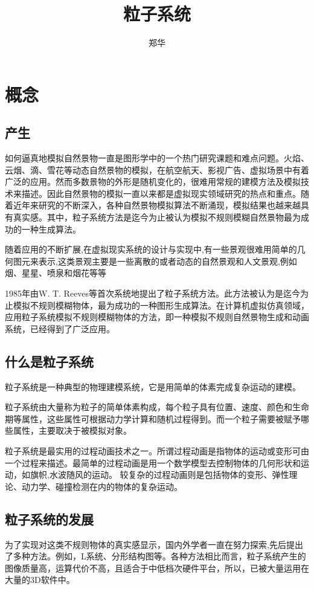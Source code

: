 \documentclass[UTF8,a4paper,14pt]{ctexart}
\author{\kaishu 郑华}
\title{\heiti 粒子系统}
\begin{document}
 	\maketitle

\newpage
\section{概念}
	\subsection{产生}
		如何逼真地模拟自然景物一直是图形学中的一个热门研究课题和难点问题。火焰、云烟、滴、雪花等动态自然景物的模拟，在航空航天、影视广告、虚拟场景中有着广泛的应用。然而多数景物的外形是随机变化的，很难用常规的建模方法及模拟技术来描述。因此自然景物的模拟一直以来都是虚拟现实领域研究的热点和重点。随着近年来研究的不断深入，各种自然景物模拟算法不断涌现，模拟结果也越来越具有真实感。其中，粒子系统方法是迄今为止被认为模拟不规则模糊自然景物最为成功的一种生成算法。
		
		随着应用的不断扩展,在虚拟现实系统的设计与实现中,有一些景观很难用简单的几何图元来表示,这类景观主要是一些离散的或者动态的自然景观和人文景观,例如烟、星星、喷泉和烟花等等 
		
		1985年由W. T. Reeves等首次系统地提出了粒子系统方法。此方法被认为是迄今为止模拟不规则模糊物体，最为成功的一种图形生成算法。在计算机虚拟仿真领域，应用粒子系统模拟不规则模糊物体的方法，即一种模拟不规则自然景物生成和动画系统，已经得到了广泛应用。
	
	\subsection{什么是粒子系统}
		粒子系统是一种典型的物理建模系统，它是用简单的体素完成复杂运动的建模。
		
		粒子系统由大量称为粒子的简单体素构成，每个粒子具有位置、速度、颜色和生命期等属性，这些属性可根据动力学计算和随机过程得到。而一个粒子需要被赋予哪些属性，主要取决于被模拟对象。
		
		粒子系统是最实用的过程动画技术之一。所谓过程动画是指物体的运动或变形可由一个过程来描述。最简单的过程动画是用一个数学模型去控制物体的几何形状和运动，如旗帜,水波随风的运动。 较复杂的过程动画则是包括物体的变形、弹性理论、动力学、碰撞检测在内的物体的复杂运动。
	
	\subsection{粒子系统的发展}
		为了实现对这类不规则物体的真实感显示，国内外学者一直在努力探索,先后提出了多种方法。例如，L系统、分形结构图等。各种方法相比而言，粒子系统产生的图像质量高，运算代价不高，且适合于中低档次硬件平台，所以，已被大量运用在大量的3D软件中。
		
\end{document}
